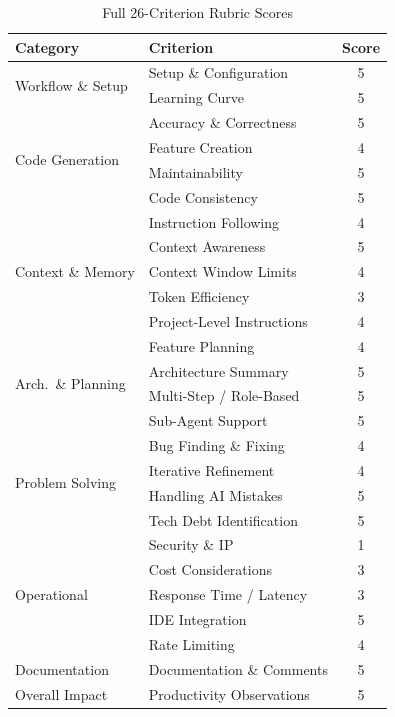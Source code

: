 \documentclass[conference]{IEEEtran}
\begin{document}
\begin{table}[t]
\caption{Full 26-Criterion Rubric Scores}
\label{tab:full_rubric}
\centering
\setlength{\tabcolsep}{3pt}
\begin{tabular}{@{}llc@{}}
\toprule
\textbf{Category} & \textbf{Criterion} & \textbf{Score} \\
\midrule
\multirow{2}{*}{Workflow \& Setup}
 & Setup \& Configuration & 5 \\
 & Learning Curve & 5 \\
\cmidrule(l){2-3}
\multirow{4}{*}{Code Generation}
 & Accuracy \& Correctness & 5 \\
 & Feature Creation & 4 \\
 & Maintainability & 5 \\
 & Code Consistency & 5 \\
\cmidrule(l){2-3}
\multirow{5}{*}{Context \& Memory}
 & Instruction Following & 4 \\
 & Context Awareness & 5 \\
 & Context Window Limits & 4 \\
 & Token Efficiency & 3 \\
 & Project-Level Instructions & 4 \\
\cmidrule(l){2-3}
\multirow{4}{*}{Arch.\ \& Planning}
 & Feature Planning & 4 \\
 & Architecture Summary & 5 \\
 & Multi-Step / Role-Based & 5 \\
 & Sub-Agent Support & 5 \\
\cmidrule(l){2-3}
\multirow{4}{*}{Problem Solving}
 & Bug Finding \& Fixing & 4 \\
 & Iterative Refinement & 4 \\
 & Handling AI Mistakes & 5 \\
 & Tech Debt Identification & 5 \\
\cmidrule(l){2-3}
\multirow{5}{*}{Operational}
 & Security \& IP & 1 \\
 & Cost Considerations & 3 \\
 & Response Time / Latency & 3 \\
 & IDE Integration & 5 \\
 & Rate Limiting & 4 \\
\cmidrule(l){2-3}
Documentation & Documentation \& Comments & 5 \\
\cmidrule(l){2-3}
Overall Impact & Productivity Observations & 5 \\
\bottomrule
\end{tabular}
\end{table}
\end{document}
